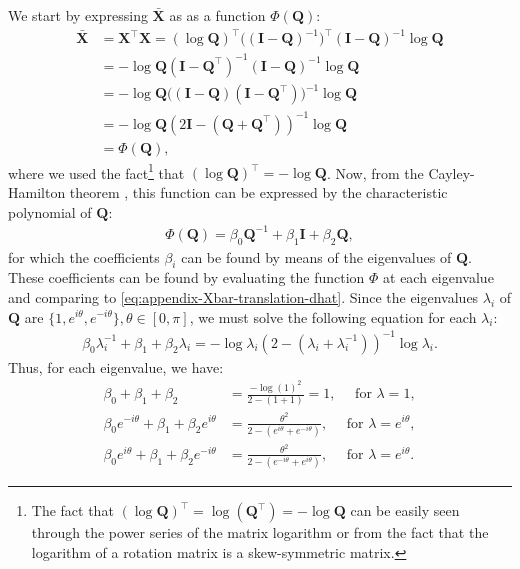 We start by expressing $\bar{\mathbf{X}}$ as as a function $\Phi(\mathbf{Q})$:
\begin{align}
    \bar{\mathbf{X}} &= \mathbf{X}^\top\mathbf{X} = (\log\mathbf{Q})^\top\bigl((\mathbf{I} - \mathbf{Q})^{-1}\bigr)^\top(\mathbf{I} - \mathbf{Q})^{-1}\log\mathbf{Q}\\
    &= -\log\mathbf{Q}(\mathbf{I} - \mathbf{Q}^\top)^{-1}(\mathbf{I} - \mathbf{Q})^{-1}\log\mathbf{Q}\\
    &=-\log\mathbf{Q}\bigl((\mathbf{I} - \mathbf{Q})(\mathbf{I} - \mathbf{Q}^\top)\bigr)^{-1}\log\mathbf{Q}\\
    &=-\log\mathbf{Q}(2\mathbf{I}-(\mathbf{Q}+\mathbf{Q}^\top))^{-1}\log\mathbf{Q} \label{eq:appendix-Xbar-translation-dhat}\\
    &= \Phi(\mathbf{Q}),
\end{align}
where we used the fact\footnote{The fact that $(\log\mathbf{Q})^\top = \log(\mathbf{Q}^\top) = -\log\mathbf{Q}$ can be easily seen through the power series of the matrix logarithm or from the fact that the logarithm of a rotation matrix is a skew-symmetric matrix.} that $(\log\mathbf{Q})^\top=-\log\mathbf{Q}$. Now, from the Cayley-Hamilton theorem \citep[p. 63]{Chen2009}, this function can be expressed by the characteristic polynomial of $\mathbf{Q}$:
\begin{align}
    \Phi(\mathbf{Q}) = \beta_0\mathbf{Q}^{-1} + \beta_1\mathbf{I} + \beta_2\mathbf{Q},
\end{align}
for which the coefficients $\beta_i$ can be found by means of the eigenvalues of $\mathbf{Q}$. These coefficients can be found by evaluating the function $\Phi$ at each eigenvalue and comparing to \eqref{eq:appendix-Xbar-translation-dhat}. Since the eigenvalues $\lambda_i$ of $\mathbf{Q}$ are $\{1, e^{i\theta}, e^{-i\theta}\},\theta\in[0,\pi]$, we must solve the following equation for each $\lambda_i$:
\begin{align}
    \beta_0\lambda^{-1}_i + \beta_1 + \beta_2\lambda_i = -\log\lambda_i(2-(\lambda_i+\lambda^{-1}_i))^{-1}\log\lambda_i.
\end{align}
Thus, for each eigenvalue, we have:
\begin{align}
        \beta_0 + \beta_1 + \beta_2 &= \frac{-\log(1)^2}{2 - (1+1)}=1,\quad\text{ for }\lambda = 1, \label{eq:appendix-cayley-lambda1}\\
        \beta_0 e^{-i\theta} + \beta_1 + \beta_2 e^{i\theta} &= \frac{\theta^2}{2 - (e^{i\theta}+ e^{-i\theta})},\quad\text{ for }\lambda = e^{i\theta}, \label{eq:appendix-cayley-lambdaeitheta}\\ 
        \beta_0 e^{i\theta} + \beta_1 + \beta_2 e^{-i\theta} &= \frac{\theta^2}{2 - (e^{-i\theta}+ e^{i\theta})},\quad\text{ for }\lambda = e^{i\theta}. \label{eq:appendix-cayley-lambdaMINUSeitheta}
\end{align}
